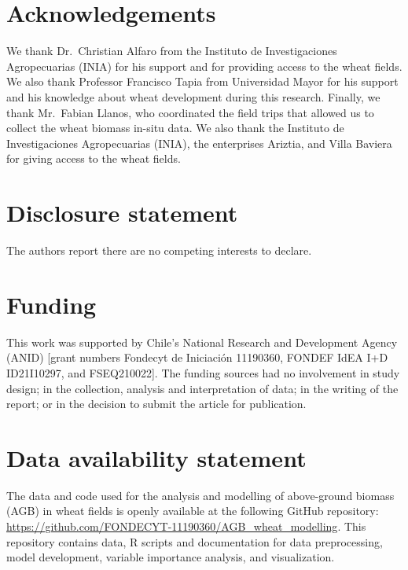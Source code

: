 \documentclass[
  british,
]{interact}
\begin{document}
\section*{Acknowledgements}\label{acknowledgements}

We thank Dr.~Christian Alfaro from the Instituto de Investigaciones
Agropecuarias (INIA) for his support and for providing access to the
wheat fields. We also thank Professor Francisco Tapia from Universidad
Mayor for his support and his knowledge about wheat development during
this research. Finally, we thank Mr.~Fabian Llanos, who coordinated the
field trips that allowed us to collect the wheat biomass in-situ data.
We also thank the Instituto de Investigaciones Agropecuarias (INIA), the
enterprises Ariztia, and Villa Baviera for giving access to the wheat
fields.

\section*{Disclosure statement}\label{disclosure-statement}

The authors report there are no competing interests to declare.

\section*{Funding}\label{funding}

This work was supported by Chile's National Research and Development
Agency (ANID) {[}grant numbers Fondecyt de Iniciación 11190360, FONDEF
IdEA I+D ID21I10297, and FSEQ210022{]}. The funding sources had no
involvement in study design; in the collection, analysis and
interpretation of data; in the writing of the report; or in the decision
to submit the article for publication.

\section*{Data availability
statement}\label{data-availability-statement}

The data and code used for the analysis and modelling of above-ground
biomass (AGB) in wheat fields is openly available at the following
GitHub repository:
\url{https://github.com/FONDECYT-11190360/AGB_wheat_modelling}. This
repository contains data, R scripts and documentation for data
preprocessing, model development, variable importance analysis, and
visualization.
\end{document}
